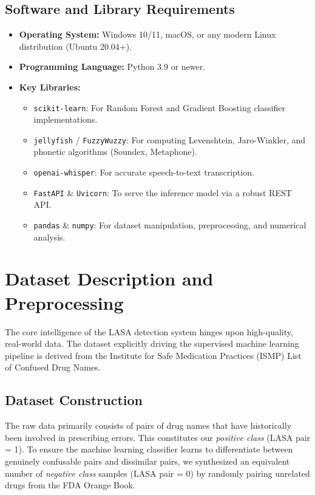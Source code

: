 \documentclass[12pt,a4paper]{report}
\begin{document}
\subsection{Software and Library Requirements}
\begin{itemize}
    \item \textbf{Operating System:} Windows 10/11, macOS, or any modern Linux distribution (Ubuntu 20.04+).
    \item \textbf{Programming Language:} Python 3.9 or newer.
    \item \textbf{Key Libraries:}
    \begin{itemize}
        \item \texttt{scikit-learn}: For Random Forest and Gradient Boosting classifier implementations.
        \item \texttt{jellyfish} / \texttt{FuzzyWuzzy}: For computing Levenshtein, Jaro-Winkler, and phonetic algorithms (Soundex, Metaphone).
        \item \texttt{openai-whisper}: For accurate speech-to-text transcription.
        \item \texttt{FastAPI} \& \texttt{Uvicorn}: To serve the inference model via a robust REST API.
        \item \texttt{pandas} \& \texttt{numpy}: For dataset manipulation, preprocessing, and numerical analysis.
    \end{itemize}
\end{itemize}

\section{Dataset Description and Preprocessing}
The core intelligence of the LASA detection system hinges upon high-quality, real-world data. The dataset explicitly driving the supervised machine learning pipeline is derived from the Institute for Safe Medication Practices (ISMP) List of Confused Drug Names.

\subsection{Dataset Construction}
The raw data primarily consists of pairs of drug names that have historically been involved in prescribing errors. This constitutes our \textit{positive class} (LASA pair = 1). To ensure the machine learning classifier learns to differentiate between genuinely confusable pairs and dissimilar pairs, we synthesized an equivalent number of \textit{negative class} samples (LASA pair = 0) by randomly pairing unrelated drugs from the FDA Orange Book. 
\end{document}
